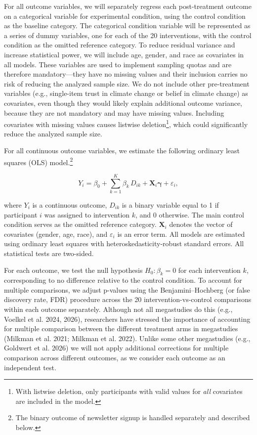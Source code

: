 \documentclass[
  letterpaper,
  DIV=11,
  numbers=noendperiod]{scrartcl}
\begin{document}
For all outcome variables, we will separately regress each
post-treatment outcome on a categorical variable for experimental
condition, using the control condition as the baseline category. The
categorical condition variable will be represented as a series of dummy
variables, one for each of the 20 interventions, with the control
condition as the omitted reference category. To reduce residual variance
and increase statistical power, we will include age, gender, and race as
covariates in all models. These variables are used to implement sampling
quotas and are therefore mandatory---they have no missing values and
their inclusion carries no risk of reducing the analyzed sample size. We
do not include other pre-treatment variables (e.g., single-item trust in
climate change or belief in climate change) as covariates, even though
they would likely explain additional outcome variance, because they are
not mandatory and may have missing values. Including covariates with
missing values causes listwise deletion\footnote{With listwise deletion,
  only participants with valid values for \emph{all} covariates are
  included in the model.}, which could significantly reduce the analyzed
sample size.

For all continuous outcome variables, we estimate the following ordinary
least squares (OLS) model.\footnote{The binary outcome of newsletter
  signup is handled separately and described below.}

\[Y_i = \beta_0 + \sum_{k=1}^{K} \beta_k \, D_{ik} + \mathbf{X}_i \boldsymbol{\gamma} + \varepsilon_i,\]

where \(Y_i\) is a continuous outcome, \(D_{ik}\) is a binary variable
equal to 1 if participant \(i\) was assigned to intervention \(k\), and
0 otherwise. The main control condition serves as the omitted reference
category. \(\mathbf{X}_i\) denotes the vector of covariates (gender,
age, race), and \(\varepsilon_i\) is an error term. All models are
estimated using ordinary least squares with heteroskedasticity-robust
standard errors. All statistical tests are two-sided.

For each outcome, we test the null hypothesis \(H_0: \beta_k = 0\) for
each intervention \(k\), corresponding to no difference relative to the
control condition. To account for multiple comparisons, we adjust
p-values using the Benjamini--Hochberg (or false discovery rate, FDR)
procedure across the 20 intervention-vs-control comparisons within each
outcome separately. Although not all megastudies do this (e.g., Voelkel
et al. 2024, 2026), researchers have stressed the importance of
accounting for multiple comparison between the different treatment arms
in megastudies (Milkman et al. 2021; Milkman et al. 2022). Unlike some
other megastudies (e.g., Goldwert et al. 2026) we will not apply
additional corrections for multiple comparison across different
outcomes, as we consider each outcome as an independent test.
\end{document}
